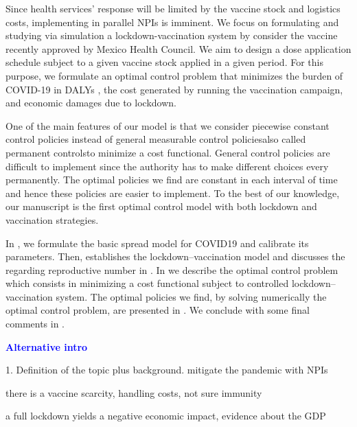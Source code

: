     Since health services' response will be limited by the vaccine stock
and logistics costs, implementing in parallel NPIs is imminent. We focus on
formulating and studying via simulation a lockdown-vaccination system by 
consider the vaccine recently approved by  Mexico Health Council.
We aim to design a dose application schedule subject to a given vaccine 
stock applied in a given period. For this purpose, we formulate an 
optimal control problem that minimizes the burden of  COVID-19 in DALYs 
\cite{WhoDALY}, the cost generated by   running the vaccination 
campaign, and economic damages due to lockdown.

    One of the main features of our model is that we consider piecewise
constant control policies instead of general measurable control 
policies\textemdash also called permanent controls\textemdash to minimize a cost 
functional. General control policies are difficult to implement since the 
authority has to make different choices every permanently. The optimal policies 
we find are constant in each interval of time and hence these policies are 
easier to implement. To the best of our knowledge, our manuscript is the first 
optimal control model with both lockdown and vaccination strategies. 


In , we formulate the
basic spread model for COVID19 and calibrate its parameters. Then,
 establishes the lockdown--vaccination model and
discusses the regarding reproductive number in
. 
In  we describe the optimal control problem 
which consists in minimizing a cost functional subject to controlled 
lockdown--vaccination system. The optimal policies we find, by solving 
numerically the optimal control problem, are presented in 
. We conclude with some final comments in 
.





\begin{center}
    \textcolor{blue}{\bf Alternative intro}
\end{center}

1. Definition of the topic plus background.
mitigate the pandemic with NPIs 

there is a vaccine scarcity, handling costs, not sure immunity   

a full lockdown yields a negative economic impact, evidence about the GDP

